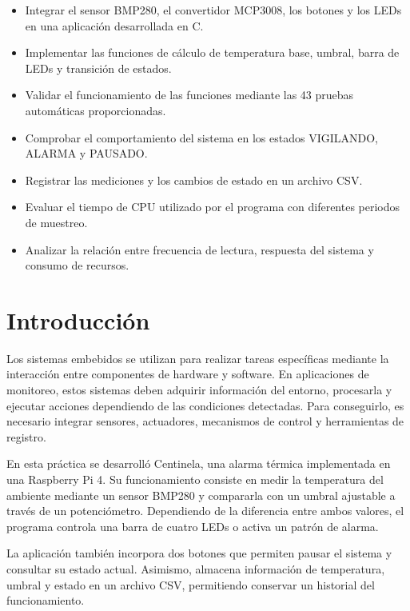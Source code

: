 \documentclass[conference]{IEEEtran}
\begin{document}
\begin{itemize}
    \item Integrar el sensor BMP280, el convertidor MCP3008, los botones y los LEDs en una aplicación desarrollada en C.
    \item Implementar las funciones de cálculo de temperatura base, umbral, barra de LEDs y transición de estados.
    \item Validar el funcionamiento de las funciones mediante las 43 pruebas automáticas proporcionadas.
    \item Comprobar el comportamiento del sistema en los estados VIGILANDO, ALARMA y PAUSADO.
    \item Registrar las mediciones y los cambios de estado en un archivo CSV.
    \item Evaluar el tiempo de CPU utilizado por el programa con diferentes periodos de muestreo.
    \item Analizar la relación entre frecuencia de lectura, respuesta del sistema y consumo de recursos.
\end{itemize}


\section{Introducción}

Los sistemas embebidos se utilizan para realizar tareas específicas mediante la interacción entre componentes de hardware y software. En aplicaciones de monitoreo, estos sistemas deben adquirir información del entorno, procesarla y ejecutar acciones dependiendo de las condiciones detectadas. Para conseguirlo, es necesario integrar sensores, actuadores, mecanismos de control y herramientas de registro.

En esta práctica se desarrolló Centinela, una alarma térmica implementada en una Raspberry Pi 4. Su funcionamiento consiste en medir la temperatura del ambiente mediante un sensor BMP280 y compararla con un umbral ajustable a través de un potenciómetro. Dependiendo de la diferencia entre ambos valores, el programa controla una barra de cuatro LEDs o activa un patrón de alarma.

La aplicación también incorpora dos botones que permiten pausar el sistema y consultar su estado actual. Asimismo, almacena información de temperatura, umbral y estado en un archivo CSV, permitiendo conservar un historial del funcionamiento.
\end{document}
